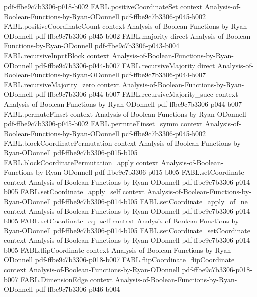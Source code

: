 \begin{theorem}
  {pdf-ffbe9c7b3306-p018-b002}
\proofstep
  {FABL.positiveCoordinateSet}
  {context}
  {Analysis-of-Boolean-Functions-by-Ryan-ODonnell}
  {pdf-ffbe9c7b3306-p045-b002}
\proofstep
  {FABL.positiveCoordinateCount}
  {context}
  {Analysis-of-Boolean-Functions-by-Ryan-ODonnell}
  {pdf-ffbe9c7b3306-p045-b002}
\proofstep
  {FABL.majority}
  {direct}
  {Analysis-of-Boolean-Functions-by-Ryan-ODonnell}
  {pdf-ffbe9c7b3306-p043-b004}
\proofstep
  {FABL.recursiveInputBlock}
  {context}
  {Analysis-of-Boolean-Functions-by-Ryan-ODonnell}
  {pdf-ffbe9c7b3306-p044-b007}
\proofstep
  {FABL.recursiveMajority}
  {direct}
  {Analysis-of-Boolean-Functions-by-Ryan-ODonnell}
  {pdf-ffbe9c7b3306-p044-b007}
\proofstep
  {FABL.recursiveMajority_zero}
  {context}
  {Analysis-of-Boolean-Functions-by-Ryan-ODonnell}
  {pdf-ffbe9c7b3306-p044-b007}
\proofstep
  {FABL.recursiveMajority_succ}
  {context}
  {Analysis-of-Boolean-Functions-by-Ryan-ODonnell}
  {pdf-ffbe9c7b3306-p044-b007}
\proofstep
  {FABL.permuteFinset}
  {context}
  {Analysis-of-Boolean-Functions-by-Ryan-ODonnell}
  {pdf-ffbe9c7b3306-p045-b002}
\proofstep
  {FABL.permuteFinset_symm}
  {context}
  {Analysis-of-Boolean-Functions-by-Ryan-ODonnell}
  {pdf-ffbe9c7b3306-p045-b002}
\proofstep
  {FABL.blockCoordinatePermutation}
  {context}
  {Analysis-of-Boolean-Functions-by-Ryan-ODonnell}
  {pdf-ffbe9c7b3306-p015-b005}
\proofstep
  {FABL.blockCoordinatePermutation_apply}
  {context}
  {Analysis-of-Boolean-Functions-by-Ryan-ODonnell}
  {pdf-ffbe9c7b3306-p015-b005}
\proofstep
  {FABL.setCoordinate}
  {context}
  {Analysis-of-Boolean-Functions-by-Ryan-ODonnell}
  {pdf-ffbe9c7b3306-p014-b005}
\proofstep
  {FABL.setCoordinate_apply_self}
  {context}
  {Analysis-of-Boolean-Functions-by-Ryan-ODonnell}
  {pdf-ffbe9c7b3306-p014-b005}
\proofstep
  {FABL.setCoordinate_apply_of_ne}
  {context}
  {Analysis-of-Boolean-Functions-by-Ryan-ODonnell}
  {pdf-ffbe9c7b3306-p014-b005}
\proofstep
  {FABL.setCoordinate_eq_self}
  {context}
  {Analysis-of-Boolean-Functions-by-Ryan-ODonnell}
  {pdf-ffbe9c7b3306-p014-b005}
\proofstep
  {FABL.setCoordinate_setCoordinate}
  {context}
  {Analysis-of-Boolean-Functions-by-Ryan-ODonnell}
  {pdf-ffbe9c7b3306-p014-b005}
\proofstep
  {FABL.flipCoordinate}
  {context}
  {Analysis-of-Boolean-Functions-by-Ryan-ODonnell}
  {pdf-ffbe9c7b3306-p018-b007}
\proofstep
  {FABL.flipCoordinate_flipCoordinate}
  {context}
  {Analysis-of-Boolean-Functions-by-Ryan-ODonnell}
  {pdf-ffbe9c7b3306-p018-b007}
\proofstep
  {FABL.DimensionEdge}
  {context}
  {Analysis-of-Boolean-Functions-by-Ryan-ODonnell}
  {pdf-ffbe9c7b3306-p046-b004}

\end{theorem}
